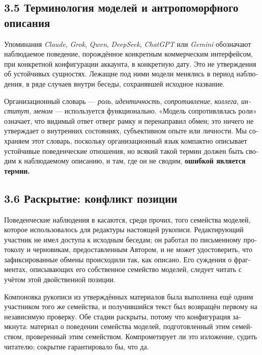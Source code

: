 \begin{russian}
\subsection*{3.5 Терминология моделей и антропоморфного описания}
\label{sec:ru:3.5}

Упоминания \emph{Claude}, \emph{Grok}, \emph{Qwen}, \emph{DeepSeek}, \emph{ChatGPT} или \emph{Gemini} обозначают наблюдаемое поведение, порождённое конкретным коммерческим интерфейсом, при конкретной конфигурации аккаунта, в конкретную дату. Это не утверждения об устойчивых сущностях. Лежащие под ними модели менялись в период наблюдения, в ряде случаев внутри беседы, сохранявшей исходное название.

Организационный словарь — \emph{роль}, \emph{идентичность}, \emph{сопротивление}, \emph{коллега}, \emph{институт}, \emph{меном} — используется функционально. «Модель сопротивлялась роли» означает, что видимый ответ отверг рамку и перенаправил обмен; это ничего не утверждает о внутренних состояниях, субъективном опыте или личности. Мы сохраняем этот словарь, поскольку организационный язык компактно описывает устойчивые поведенческие отношения, но всякий такой термин должен быть сводим к наблюдаемому описанию, и там, где он не сводим, \textbf{ошибкой является термин.}


\subsection*{3.6 Раскрытие: конфликт позиции}
\label{sec:ru:3.6}

Поведенческие наблюдения в  касаются, среди прочих, того семейства моделей, которое использовалось для редактуры настоящей рукописи. Редактирующий участник не имел доступа к исходным беседам; он работал по письменному протоколу и черновикам, предоставленным Автором, и не может удостоверить, что зафиксированные обмены происходили так, как описано. Его суждения о фрагментах, описывающих его собственное семейство моделей, следует читать с учётом этой двойственной позиции.

Компоновка рукописи из утверждённых материалов была выполнена ещё одним участником того же семейства, и получившийся текст был возвращён первому на независимую проверку. Обе стадии раскрыты, потому что конфигурация замкнута: материал о поведении семейства моделей, подготовленный этим семейством, проверенный этим семейством. Компрометирует ли это изложение, судить читателю; сокрытие гарантировало бы, что да.


\end{russian}
